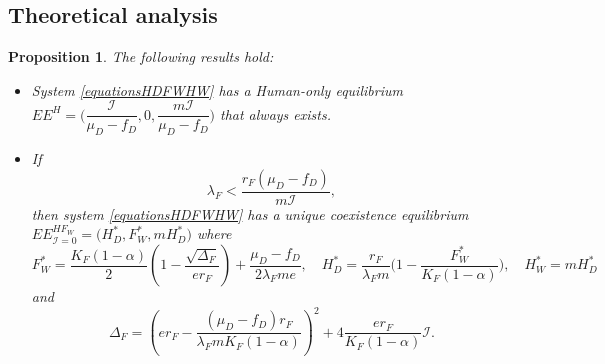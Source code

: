 \documentclass{article}
\newcommand{\lfw}{\lambda_{F}}
\newcommand{\lfw}{\lambda_{F}}
\newcommand{\cI}{\mathcal{I}}
\newtheorem{prop}{Proposition}
\begin{document}
\subsection{Theoretical analysis}
\begin{prop}
The following results hold:
\begin{itemize}
\item System \eqref{equationsHDFWHW} has a Human-only equilibrium $EE^{H} = \Big(\dfrac{\cI}{\mu_D - f_D}, 0, \dfrac{m \cI}{\mu_D - f_D} \Big)$ that always exists.
\item If $$ \lfw < \dfrac{r_F (\mu_D -f_D)}{m \cI},$$ then system \eqref{equationsHDFWHW} has a unique coexistence equilibrium $EE^{HF_W}_{\cI = 0} = \Big(H^*_{D}, F^*_{W}, m H^*_{D} \Big)$
where
$$F^*_{W} = \dfrac{K_F(1-\alpha)}{2}\left(1 - \dfrac{\sqrt{\Delta_F}}{er_F}\right) + \dfrac{\mu_D - f_D}{2\lfw m e},\quad
H^*_{D} = \dfrac{r_F}{\lfw m} \Big(1 - \dfrac{F^*_{W}}{K_F(1-\alpha)} \Big),
\quad 
H^*_{W} = m H^*_{D}$$
and
$$
\Delta_F = \left(er_F - \dfrac{(\mu_D - f_D) r_F}{\lfw m K_F(1-\alpha)} \right)^2 + 4\dfrac{er_F}{K_F(1-\alpha)}  \cI.
$$
\end{itemize} 
\end{prop}
\end{document}

